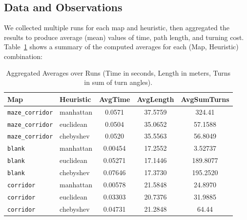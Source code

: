 \documentclass[letterpaper, 10 pt, conference]{ieeeconf}
\begin{document}
\subsection{Data and Observations}
We collected multiple runs for each map and heuristic, then aggregated the results to produce average (mean) values of time, path length, and turning cost. Table~\ref{table:aggregated} shows a summary of the computed averages for each (Map, Heuristic) combination:

\begin{table}[!ht]
\centering
\footnotesize
\caption{Aggregated Averages over Runs (Time in seconds, Length in meters, Turns in sum of turn angles).}
\label{table:aggregated}
\begin{tabular}{|l|l|c|c|c|}
\hline
\textbf{Map} & \textbf{Heuristic} & \textbf{AvgTime} & \textbf{AvgLength} & \textbf{AvgSumTurns} \\
\hline
\texttt{maze\_corridor} & manhattan & 0.0571 & 37.5759 & 324.41 \\
\texttt{maze\_corridor} & euclidean & 0.0504 & 35.0652 & 57.1588 \\
\texttt{maze\_corridor} & chebyshev & 0.0520 & 35.5563 & 56.8049 \\
\hline
\texttt{blank} & manhattan & 0.00454 & 17.2552 & 3.52737 \\
\texttt{blank} & euclidean & 0.05271 & 17.1446 & 189.8077 \\
\texttt{blank} & chebyshev & 0.07646 & 17.3730 & 195.2520 \\
\hline
\texttt{corridor} & manhattan & 0.00578 & 21.5848 & 24.8970 \\
\texttt{corridor} & euclidean & 0.03303 & 20.7376 & 31.9885 \\
\texttt{corridor} & chebyshev & 0.04731 & 21.2848 & 64.44 \\
\hline
\end{tabular}
\end{table}
\end{document}
